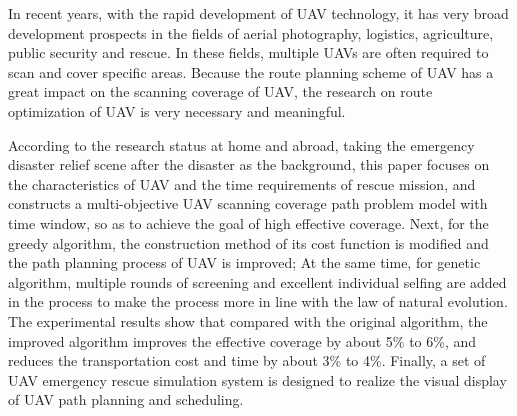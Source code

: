 \begin{eabstract}
  In recent years, with the rapid development of UAV technology, it has very broad development prospects in the fields of aerial photography, logistics, agriculture, public security and rescue. In these fields, multiple UAVs are often required to scan and cover specific areas. Because the route planning scheme of UAV has a great impact on the scanning coverage of UAV, the research on route optimization of UAV is very necessary and meaningful.



  According to the research status at home and abroad, taking the emergency disaster relief scene after the disaster as the background, this paper focuses on the characteristics of UAV and the time requirements of rescue mission, and constructs a multi-objective UAV scanning coverage path problem model with time window, so as to achieve the goal of high effective coverage. Next, for the greedy algorithm, the construction method of its cost function is modified and the path planning process of UAV is improved; At the same time, for genetic algorithm, multiple rounds of screening and excellent individual selfing are added in the process to make the process more in line with the law of natural evolution. The experimental results show that compared with the original algorithm, the improved algorithm improves the effective coverage by about 5\% to 6\%, and reduces the transportation cost and time by about 3\% to 4\%. Finally, a set of UAV emergency rescue simulation system is designed to realize the visual display of UAV path planning and scheduling.
\end{eabstract}
